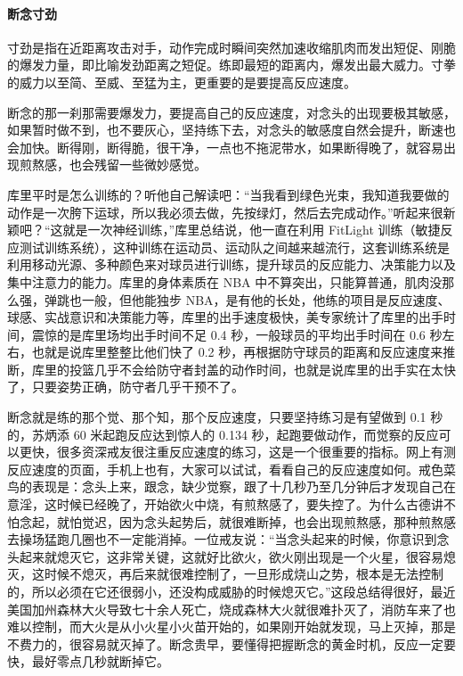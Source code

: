\paragraph{断念寸劲}

寸劲是指在近距离攻击对手，动作完成时瞬间突然加速收缩肌肉而发出短促、刚脆的爆发力量，即比喻发劲距离之短促。练即最短的距离内，爆发出最大威力。寸拳的威力以至简、至威、至猛为主，更重要的是要提高反应速度。

断念的那一刹那需要爆发力，要提高自己的反应速度，对念头的出现要极其敏感，如果暂时做不到，也不要灰心，坚持练下去，对念头的敏感度自然会提升，断速也会加快。断得刚，断得脆，很干净，一点也不拖泥带水，如果断得晚了，就容易出现煎熬感，也会残留一些微妙感觉。

库里平时是怎么训练的？听他自己解读吧：“当我看到绿色光束，我知道我要做的动作是一次胯下运球，所以我必须去做，先按绿灯，然后去完成动作。”听起来很新颖吧？“这就是一次神经训练，”库里总结说，他一直在利用 FitLight 训练（敏捷反应测试训练系统），这种训练在运动员、运动队之间越来越流行，这套训练系统是利用移动光源、多种颜色来对球员进行训练，提升球员的反应能力、决策能力以及集中注意力的能力。库里的身体素质在 NBA 中不算突出，只能算普通，肌肉没那么强，弹跳也一般，但他能独步 NBA，是有他的长处，他练的项目是反应速度、球感、实战意识和决策能力等，库里的出手速度极快，美专家统计了库里的出手时间，震惊的是库里场均出手时间不足 0.4 秒，一般球员的平均出手时间在 0.6 秒左右，也就是说库里整整比他们快了 0.2 秒，再根据防守球员的距离和反应速度来推断，库里的投篮几乎不会给防守者封盖的动作时间，也就是说库里的出手实在太快了，只要姿势正确，防守者几乎干预不了。

断念就是练的那个觉、那个知，那个反应速度，只要坚持练习是有望做到 0.1 秒的，苏炳添 60 米起跑反应达到惊人的 0.134 秒，起跑要做动作，而觉察的反应可以更快，很多资深戒友很注重反应速度的练习，这是一个很重要的指标。网上有测反应速度的页面，手机上也有，大家可以试试，看看自己的反应速度如何。戒色菜鸟的表现是：念头上来，跟念，缺少觉察，跟了十几秒乃至几分钟后才发现自己在意淫，这时候已经晚了，开始欲火中烧，有煎熬感了，要失控了。为什么古德讲不怕念起，就怕觉迟，因为念头起势后，就很难断掉，也会出现煎熬感，那种煎熬感去操场猛跑几圈也不一定能消掉。一位戒友说：“当念头起来的时候，你意识到念头起来就熄灭它，这非常关键，这就好比欲火，欲火刚出现是一个火星，很容易熄灭，这时候不熄灭，再后来就很难控制了，一旦形成烧山之势，根本是无法控制的，所以必须在它还很弱小，还没构成威胁的时候熄灭它。”这段总结得很好，最近美国加州森林大火导致七十余人死亡，烧成森林大火就很难扑灭了，消防车来了也难以控制，而大火是从小火星小火苗开始的，如果刚开始就发现，马上灭掉，那是不费力的，很容易就灭掉了。断念贵早，要懂得把握断念的黄金时机，反应一定要快，最好零点几秒就断掉它。

